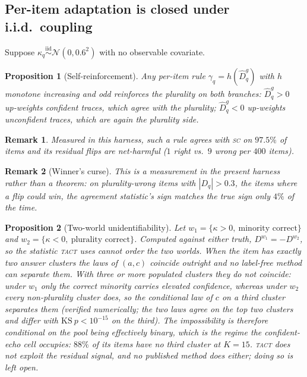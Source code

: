 \documentclass{article}
\newtheorem{proposition}{Proposition}
\newtheorem{remark}{Remark}
\newcommand{\Dhat}{\widehat{D}}
\newcommand{\SC}{\textsc{sc}}
\newcommand{\TACT}{\textsc{tact}}
\begin{document}
\subsection{Per-item adaptation is closed under i.i.d.\ coupling}
Suppose $\kappa_q\stackrel{\text{iid}}{\sim}\mathcal{N}(0,0.6^2)$ with no observable covariate.

\begin{proposition}[Self-reinforcement]\label{prop:selfreinf}
Any per-item rule $\gamma_q=h(\Dhat^g_q)$ with $h$ monotone increasing and odd reinforces the plurality on both branches: $\Dhat^g_q>0$ up-weights confident traces, which agree with the plurality; $\Dhat^g_q<0$ up-weights unconfident traces, which are again the plurality side.
\end{proposition}
\begin{remark}
Measured in this harness, such a rule agrees with \SC{} on $97.5\%$ of items and its residual flips are net-harmful ($1$ right vs.\ $9$ wrong per $400$ items).
\end{remark}

\begin{remark}[Winner's curse]\label{prop:curse}
This is a measurement in the present harness rather than a theorem: on plurality-wrong items with $|D_q|>0.3$, the items where a flip could win, the agreement statistic's sign matches the true sign only $4\%$ of the time.
\end{remark}

\begin{proposition}[Two-world unidentifiability]\label{prop:twoworld}
Let $w_1=\{\kappa>0,\ \text{minority correct}\}$ and
$w_2=\{\kappa<0,\ \text{plurality correct}\}$. Computed against either truth,
$D^{w_1}=-D^{w_2}$, so the statistic \TACT{} uses cannot order the two worlds.
When the item has exactly two answer clusters the laws of $(a,c)$ coincide
outright and no label-free method can separate them. With three or more
\emph{populated} clusters they do not coincide: under $w_1$ only the correct
minority carries elevated confidence, whereas under $w_2$ every non-plurality
cluster does, so the conditional law of $c$ on a third cluster separates them
(verified numerically; the two laws agree on the top two clusters and differ
with $\mathrm{KS}\ p<10^{-15}$ on the third). The impossibility is therefore
conditional on the pool being effectively binary, which is the regime the
confident-echo cell occupies: $88\%$ of its items have no third cluster at
$K{=}15$. \TACT{} does not exploit the residual signal, and no published
method does either; doing so is left open.
\end{proposition}
\end{document}
